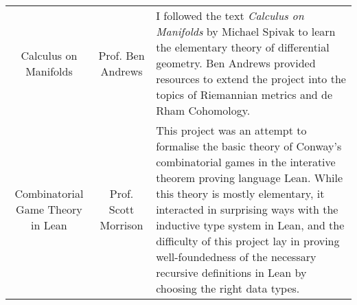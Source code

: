 \documentclass[a4paper,10pt]{article} %
\begin{document}
\begin{tabulary}{\textwidth}{ C  C  L }
Calculus on Manifolds & Prof. Ben Andrews & \footnotesize I followed the text \emph{Calculus on Manifolds} by Michael Spivak to learn the elementary theory of differential geometry. Ben Andrews provided resources to extend the project into the topics of Riemannian metrics and de Rham Cohomology.\normalsize\\

Combinatorial Game Theory in Lean & Prof. Scott Morrison & \footnotesize This project was an attempt to formalise the basic theory of Conway's combinatorial games in the interative theorem proving language Lean. While this theory is mostly elementary, it interacted in surprising ways with the inductive type system in Lean, and the difficulty of this project lay in proving well-foundedness of the necessary recursive definitions in Lean by choosing the right data types.\normalsize\\
\end{tabulary}
\egroup
\end{document}
